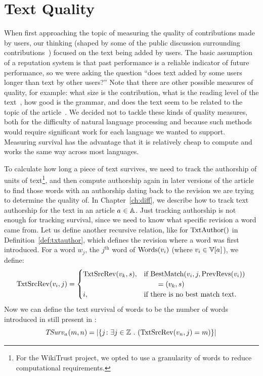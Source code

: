 \section{Text Quality}
\label{sec:textquality}

When first approaching the topic of measuring the quality
of contributions made by users, our thinking (shaped
by some of the public discussion surrounding
contributions~\cite{Swartz2006})
focused on the text being added by users.
The basic assumption of a reputation system is that past performance
is a reliable indicator of future performance, so we were
asking the question ``does text added by some users 
longer than text by other users?''
Note that there are other possible measures of quality, for example:
what size is the contribution, what is the reading level of the
text~\cite{Flesch1948,Gunning1952},
how good is the grammar, and does the text seem to be related to
the topic of the article~\cite{Itakura2009}.
We decided not to tackle these kinds of quality measures, both for
the difficulty of natural language processing and because such
methods would require significant work for each language we wanted
to support.
Measuring survival has the advantage that it is relatively cheap to
compute and works the same way across most languages.

To calculate how long a piece of text survives,
we need to track the authorship of
units of text\footnote{For the WikiTrust project, we opted to
use a granularity of words to reduce computational requirements.},
and then compute authorship again in later
versions of the article to find those words with an
authorship dating back to the revision we are trying
to determine the quality of.
In Chapter~\ref{ch:diff}, we describe how to track text authorship
for the text in an article $a_{} \in \mathbb{A}$.
Just tracking authorship is not enough for tracking survival, since
we need to know what specific revision a word came from.
Let us define another recursive relation, like
for $\mathrm{TxtAuthor}()$ in Definition~\ref{def:txtauthor},
which defines the revision where a word was first introduced.
For a word $w_j$, the $j^{\text{th}}$ word of $\mathrm{Words}(v_{i})$ (where
$\version{i} \in \versions{\article{}}$), we define:
\begin{equation*}
\mathrm{TxtSrcRev}(v_{i}, j) =
    \begin{cases}
        \mathrm{TxtSrcRev}(v_{k}, s), & \text{if }
          \mathrm{BestMatch}(v_{i}, j, \mathrm{PrevRevs}(v_{i})) \\
          & \qquad = (v_{k}, s) \\
        i, & \text{if there is no best match text.} \\
    \end{cases}
\end{equation*}
Now we can define the text survival of words to be the number of
words introduced in  still present in :
\begin{equation}
\tsurv{\article{}}{m,n} = \left| \left\{ j \colon
    \exists j \in \mathbb{Z}~.~( \txtsrcrev{\version{n},j} = m ) \right\} \right| \\
\label{eq:tsurv}
\end{equation}

